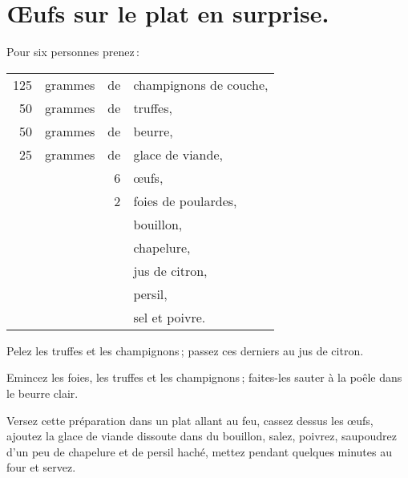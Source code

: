 \section*{\centering Œufs sur le plat en surprise.}

Pour six personnes prenez :

\medskip

\footnotesize
\begin{longtable}{rrrp{16em}}
  125  & grammes & de & champignons de couche,                                                            \\
   50  & grammes & de & truffes,                                                                          \\
   50  & grammes & de & beurre,                                                                           \\
   25  & grammes & de & glace de viande,                                                                  \\
       &         &  6 & œufs,                                                                             \\
       &         &  2 & foies de poulardes,                                                               \\
       &         &    & bouillon,                                                                         \\
       &         &    & chapelure,                                                                        \\
       &         &    & jus de citron,                                                                    \\
       &         &    & persil,                                                                           \\
       &         &    & sel et poivre.                                                                    \\
\end{longtable}
\normalsize


Pelez les truffes et les champignons ; passez ces derniers au jus de citron.

Emincez les foies, les truffes et les champignons ; faites-les sauter à la
poêle dans le beurre clair.

Versez cette préparation dans un plat allant au feu, cassez dessus les œufs,
ajoutez la glace de viande dissoute dans du bouillon, salez, poivrez, saupoudrez
d'un peu de chapelure et de persil haché, mettez pendant quelques minutes au
four et servez.

